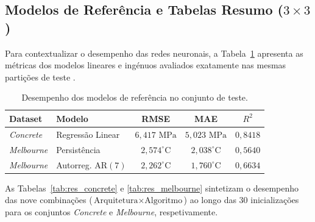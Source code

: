 \documentclass[conference]{IEEEtran}
\begin{document}
\subsection{Modelos de Referência e Tabelas Resumo ($3 \times 3$)}

Para contextualizar o desempenho das redes neuronais, a Tabela~\ref{tab:baselines} apresenta as métricas dos modelos lineares e ingénuos avaliados exatamente nas mesmas partições de teste \cite{b1, b10}.

\begin{table}[htbp]
\caption{Desempenho dos modelos de referência no conjunto de teste.}
\label{tab:baselines}
\centering
\scriptsize
\begin{tabular}{@{}llccc@{}}
\toprule
\textbf{Dataset} & \textbf{Modelo} & \textbf{RMSE} & \textbf{MAE} & \textbf{$R^2$} \\
\midrule
\textit{Concrete} & Regressão Linear & $6{,}417\text{ MPa}$ & $5{,}023\text{ MPa}$ & $0{,}8418$ \\
\midrule
\textit{Melbourne} & Persistência & $2{,}574^{\circ}\text{C}$ & $2{,}038^{\circ}\text{C}$ & $0{,}5640$ \\
\textit{Melbourne} & Autorreg. $\text{AR}(7)$ & $2{,}262^{\circ}\text{C}$ & $1{,}760^{\circ}\text{C}$ & $0{,}6634$ \\
\bottomrule
\end{tabular}
\end{table}

As Tabelas~\ref{tab:res_concrete} e \ref{tab:res_melbourne} sintetizam o desempenho das nove combinações ($\text{Arquitetura} \times \text{Algoritmo}$) ao longo das $30$ inicializações para os conjuntos \textit{Concrete} e \textit{Melbourne}, respetivamente.
\end{document}
